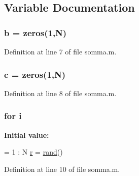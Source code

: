 \subsection{Variable Documentation}
\hypertarget{a00035_a21ad0bd836b90d08f4cf640b4c298e7c}{
\subsubsection[{b}]{\setlength{\rightskip}{0pt plus 5cm}b = zeros(1,N)}}\label{a00035_a21ad0bd836b90d08f4cf640b4c298e7c}


Definition at line 7 of file somma.\+m.

\hypertarget{a00035_ae0323a9039add2978bf5b49550572c7c}{
\subsubsection[{c}]{\setlength{\rightskip}{0pt plus 5cm}c = zeros(1,N)}}\label{a00035_ae0323a9039add2978bf5b49550572c7c}


Definition at line 8 of file somma.\+m.

\hypertarget{a00035_a6f6ccfcf58b31cb6412107d9d5281426}{
\subsubsection[{i}]{\setlength{\rightskip}{0pt plus 5cm}for i}}\label{a00035_a6f6ccfcf58b31cb6412107d9d5281426}
{\bfseries Initial value\+:}
\begin{DoxyCode}
= 1 : N
    \hyperlink{a00027_ac862e7284527eb913b1351c8bfb8e079}{r} = \hyperlink{a00112_a078f67f8fbdd9ac6587e03bdf2651d32}{rand}()
\end{DoxyCode}


Definition at line 10 of file somma.\+m.

